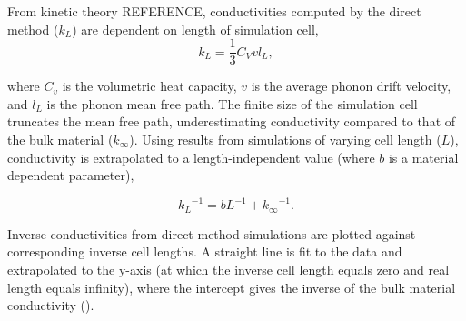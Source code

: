 \documentclass[%
preprint,                                  %
nofootinbib,
 amsmath,amssymb,
 aps,
]{revtex4-1}
\begin{document}



From kinetic theory REFERENCE, conductivities computed by the direct method ($k_L$) are dependent on length of simulation cell,
\begin{equation}
k_{L} = \frac{1}{3} C_{V} v l_{L} \label{length-dep},
\end{equation}

where $C_v$ is the volumetric heat capacity, $v$ is the average phonon drift velocity, and $l_L$ is the phonon mean free path. The finite size of the simulation cell truncates the mean free path, underestimating conductivity compared to that of the bulk material ($k_\infty$). Using results from simulations of varying cell length ($L$), conductivity is extrapolated to a length-independent value (where $b$ is a material dependent parameter),

\begin{equation}
{k_{L}}^{-1} = b L^{-1} + {k_{\infty}}^{-1} \label{linear-extrap}.
\end{equation}

Inverse conductivities from direct method simulations are plotted against corresponding inverse cell lengths. A straight line is fit to the data and extrapolated to the y-axis (at which the inverse cell length equals zero and real length equals infinity), where the intercept gives the inverse of the bulk material conductivity (\citet{Schelling2002}).

\end{document}
